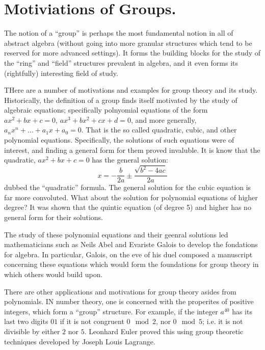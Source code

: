 
\section{Motiviations of Groups.}
\label{section1}

The notion of a ``group'' is perhaps the most fundamental notion in all of
abstract algebra (without going into more granular structures which tend to be
reserved for more advanced settings). It forms the building blocks for the study
of the ``ring'' and ``field'' structures prevalent in algebra, and it even forms
its (rightfully) interesting field of study.

THere are a number of motivations and examples for group theory and its study.
Historically, the definition of a group finds itself motivated by the study of
algebraic equations; specifically polnyomial equations of the form
$ax^2+bx+c=0$, $ax^3+bx^2+cx+d=0$, and more generally,
$a_nx^n+\dots+a_1x+a_0=0$. That is the so called quadratic, cubic, and other
polynomial equations. Specifically, the solutions of such equations were of
interest, and finding a general form for them proved invaluble. It is know that
the quadratic, $ax^2+bx+c=0$ has the general solution:
\begin{equation}
    x = -\frac{b}{2a} \pm \frac{\sqrt{b^2-4ac}}{2a}
\end{equation}
 dubbed the ``quadratic'' formula. The general solution for the cubic equation
 is far more convoluted. What about the solution for polynomial equations of
 higher degree? It was shown that the quintic equation (of degree 5) and higher
 has no general form for their solutions.

 The study of these polynomial equations and their geenral solutions led
 mathematicians such as Neils Abel and Evariste Galois to develop the
 fondations for algebra. In particular, Galois, on the eve of his duel composed
 a manuscript concerning these equations which would form the foundations for
 group theory in which others would build upon.

 There are other applications and motivations for group theory asides from
 polynomials. IN number theory, one is concerned with the properites of positive
 integers, which form a ``group'' structure. For example, if the integer
 $a^{40}$ has its last two digits $01$ if it is not congruent  $0 \mod{2}$, nor
 $0 \mod{5}$; i.e. it is not divisible by either $2$ nor  $5$. Leonhard Euler
 proved this using group theoretic techniques developed by Joseph Louis
 Lagrange.

